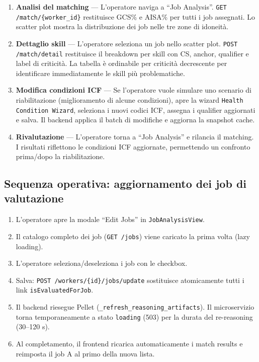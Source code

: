 \documentclass[a4paper,12pt]{article}
\begin{document}
\begin{enumerate}
  \item \textbf{Analisi del matching} --- L'operatore naviga a
        ``Job Analysis''. \texttt{GET /match/\{worker\_id\}} restituisce
        GCS\% e AISA\% per tutti i job assegnati. Lo scatter plot mostra
        la distribuzione dei job nelle tre zone di idoneit\`{a}.

  \item \textbf{Dettaglio skill} --- L'operatore seleziona un job nello
        scatter plot. \texttt{POST /match/detail} restituisce il breakdown
        per skill con CS, anchor, qualifier e label di criticit\`{a}.
        La tabella \`{e} ordinabile per criticit\`{a} decrescente per
        identificare immediatamente le skill pi\`{u} problematiche.

  \item \textbf{Modifica condizioni ICF} --- Se l'operatore vuole simulare
        uno scenario di riabilitazione (miglioramento di alcune condizioni),
        apre la wizard \texttt{Health Condition Wizard}, seleziona i nuovi
        codici ICF, assegna i qualifier aggiornati e salva. Il backend
        applica il batch di modifiche e aggiorna la snapshot cache.

  \item \textbf{Rivalutazione} --- L'operatore torna a ``Job Analysis''
        e rilancia il matching. I risultati riflettono le condizioni ICF
        aggiornate, permettendo un confronto prima/dopo la riabilitazione.
\end{enumerate}

\subsection{Sequenza operativa: aggiornamento dei job di valutazione}

\begin{enumerate}
  \item L'operatore apre la modale ``Edit Jobs'' in \texttt{JobAnalysisView}.
  \item Il catalogo completo dei job (\texttt{GET /jobs}) viene caricato
        la prima volta (lazy loading).
  \item L'operatore seleziona/deseleziona i job con le checkbox.
  \item Salva: \texttt{POST /workers/\{id\}/jobs/update} sostituisce
        atomicamente tutti i link \texttt{isEvaluatedForJob}.
  \item Il backend riesegue Pellet (\texttt{\_refresh\_reasoning\_artifacts}).
        Il microservizio torna temporaneamente a stato \texttt{loading}
        (503) per la durata del re-reasoning (30--120 s).
  \item Al completamento, il frontend ricarica automaticamente i match
        results e reimposta il job A al primo della nuova lista.
\end{enumerate}
\end{document}
